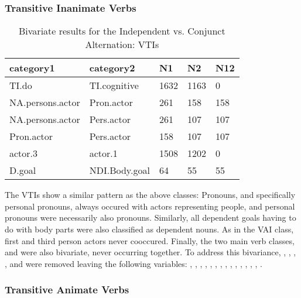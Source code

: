 \FloatBarrier

\FloatBarrier

\subsubsection{Transitive Inanimate Verbs}

\begin{table}[H]
\centering
\begin{tabular}{lllll}
\toprule
category1        & category2  & N1   & N2   & N12 \\
\midrule
TI.do & TI.cognitive & 1632 & 1163 & 0 \\
NA.persons.actor & Pron.actor & 261 & 158 & 158 \\
NA.persons.actor & Pers.actor & 261 & 107 & 107 \\
Pron.actor & Pers.actor & 158 & 107 & 107 \\
actor.3 & actor.1 & 1508 & 1202 & 0 \\
D.goal & NDI.Body.goal & 64 & 55 & 55 \\
\bottomrule
\end{tabular}
\caption{
   Bivariate results for the Independent vs. Conjunct Alternation: VTIs \\ \label{tab:ticnjuni}
  }
\end{table}

The VTIs show a similar pattern as the above classes: Pronouns, and specifically personal pronouns, always occured with actors representing people, and personal pronouns were necessarily also pronouns. Similarly, all dependent goals having to do with body parts were also classified as dependent nouns. As in the VAI class, first and third person actors never cooccured. Finally, the two main verb classes,  and  were also bivariate, never occurring together. To address this bivariance, , , , , and  were removed leaving the following variables: , , , , , , , , , , , , , , .

\FloatBarrier
\FloatBarrier

\subsubsection{Transitive Animate Verbs}

